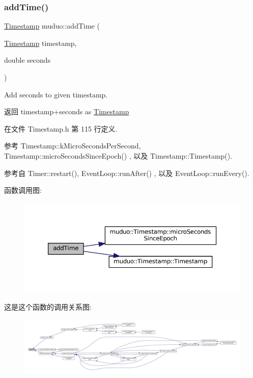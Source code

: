 \subsubsection{\texorpdfstring{add\+Time()}{addTime()}}
{\footnotesize\ttfamily \hyperlink{classmuduo_1_1Timestamp}{Timestamp} muduo\+::add\+Time (\begin{DoxyParamCaption}\item[{\hyperlink{classmuduo_1_1Timestamp}{Timestamp}}]{timestamp,  }\item[{double}]{seconds }\end{DoxyParamCaption})\hspace{0.3cm}{\ttfamily [inline]}}

Add {\ttfamily seconds} to given timestamp.

\begin{DoxyReturn}{返回}
timestamp+seconds as \hyperlink{classmuduo_1_1Timestamp}{Timestamp} 
\end{DoxyReturn}


在文件 Timestamp.\+h 第 115 行定义.



参考 Timestamp\+::k\+Micro\+Seconds\+Per\+Second, Timestamp\+::micro\+Seconds\+Since\+Epoch() , 以及 Timestamp\+::\+Timestamp().



参考自 Timer\+::restart(), Event\+Loop\+::run\+After() , 以及 Event\+Loop\+::run\+Every().

函数调用图\+:
\nopagebreak
\begin{figure}[H]
\begin{center}
\leavevmode
\includegraphics[width=350pt]{namespacemuduo_a4c4a0e85f7b5c4056878cd7cf26a83cb_cgraph}
\end{center}
\end{figure}
这是这个函数的调用关系图\+:
\nopagebreak
\begin{figure}[H]
\begin{center}
\leavevmode
\includegraphics[width=350pt]{namespacemuduo_a4c4a0e85f7b5c4056878cd7cf26a83cb_icgraph}
\end{center}
\end{figure}
\mbox{\label{namespacemuduo_a4b813c501ed67387236a1291d1873ab5}} 
